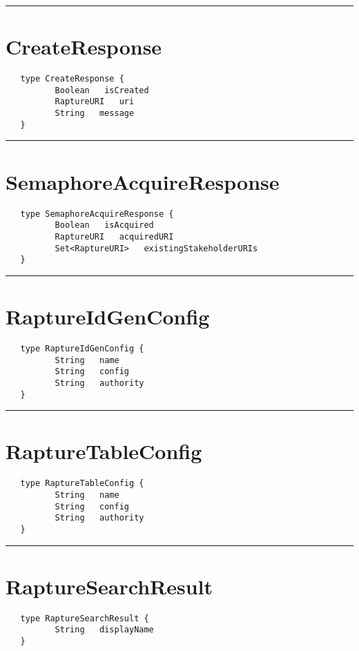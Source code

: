 \rule{15cm}{2pt}
\section{CreateResponse}
\label{type:CreateResponse}

\begin{verbatim}
   type CreateResponse {
          Boolean   isCreated
          RaptureURI   uri
          String   message
   }
\end{verbatim}

\rule{15cm}{2pt}
\section{SemaphoreAcquireResponse}
\label{type:SemaphoreAcquireResponse}

\begin{verbatim}
   type SemaphoreAcquireResponse {
          Boolean   isAcquired
          RaptureURI   acquiredURI
          Set<RaptureURI>   existingStakeholderURIs
   }
\end{verbatim}

\rule{15cm}{2pt}
\section{RaptureIdGenConfig}
\label{type:RaptureIdGenConfig}

\begin{verbatim}
   type RaptureIdGenConfig {
          String   name
          String   config
          String   authority
   }
\end{verbatim}

\rule{15cm}{2pt}
\section{RaptureTableConfig}
\label{type:RaptureTableConfig}

\begin{verbatim}
   type RaptureTableConfig {
          String   name
          String   config
          String   authority
   }
\end{verbatim}

\rule{15cm}{2pt}
\section{RaptureSearchResult}
\label{type:RaptureSearchResult}

\begin{verbatim}
   type RaptureSearchResult {
          String   displayName
   }
\end{verbatim}


